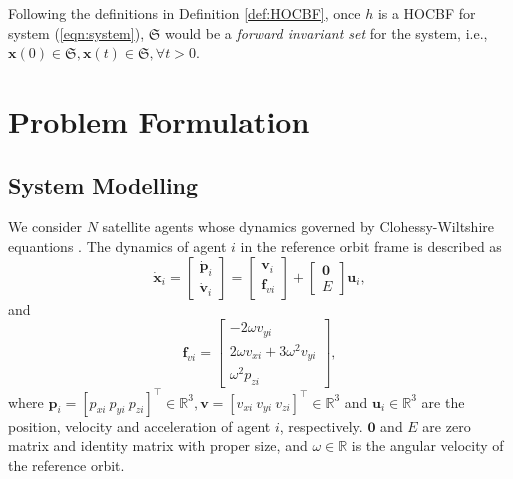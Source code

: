 \documentclass{ifacconf}
\begin{document}
\begin{thm}
   \par Following the definitions in Definition \ref{def:HOCBF}, once $h$ is a HOCBF for system (\ref{eqn:system}), $\mathfrak{S}$ would be a \textit{forward invariant set} for the system, i.e., $\boldsymbol{x}(0) \in \mathfrak{S}, \boldsymbol{x}(t) \in \mathfrak{S}, \forall t > 0$.
\end{thm}

\section{Problem Formulation}
\subsection{System Modelling}
\par We consider $N$ satellite agents whose dynamics governed by Clohessy-Wiltshire equantions \cite[]{CWequations}.
The dynamics of agent $i$ in the reference orbit frame is described as
\begin{equation}
   \dot{\boldsymbol{x}}_i = 
      \begin{bmatrix}
         \dot{\boldsymbol{p}}_i \\ \dot{\boldsymbol{v}}_i
      \end{bmatrix} = 
      \begin{bmatrix}
         \boldsymbol{v}_i \\ \boldsymbol{f}_{vi}
      \end{bmatrix} + 
      \begin{bmatrix}
         \boldsymbol{0} \\ E
      \end{bmatrix} \boldsymbol{u}_i,
\end{equation}
and
\begin{equation}
   \boldsymbol{f}_{vi} = 
      \begin{bmatrix}
         -2 \omega v_{yi} \\
         2\omega v_{xi} + 3\omega^2 v_{yi} \\
         \omega^2 p_{zi}
      \end{bmatrix},
\end{equation}
where $\boldsymbol{p}_i = [p_{xi}~p_{yi}~p_{zi}]^{\top} \in \mathbb{R}^3, \boldsymbol{v} = [v_{xi}~v_{yi}~v_{zi}]^\top \in \mathbb{R}^3$ and $\boldsymbol{u}_i \in \mathbb{R}^3$ are the position, velocity and acceleration of agent $i$, respectively.
$\boldsymbol{0}$ and $E$ are zero matrix and identity matrix with proper size, and $\omega \in \mathbb{R}$ is the angular velocity of the reference orbit.
\end{document}
